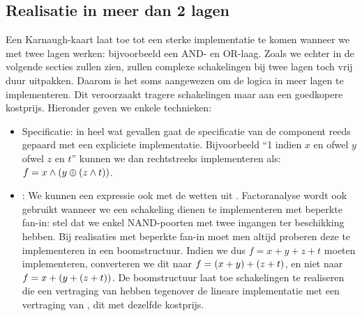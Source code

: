 \subsection{Realisatie in meer dan 2 lagen}
Een Karnaugh-kaart laat toe tot een sterke implementatie te komen wanneer we met twee lagen werken: bijvoorbeeld een AND- en OR-laag. Zoals we echter in de volgende secties zullen zien, zullen complexe schakelingen bij twee lagen toch vrij duur uitpakken. Daarom is het soms aangewezen om de logica in meer lagen te implementeren. Dit veroorzaakt tragere schakelingen maar aan een goedkopere kostprijs. Hieronder geven we enkele technieken:

\begin{itemize}
 \item Specificatie: in heel wat gevallen gaat de specificatie van de component reeds gepaard met een expliciete implementatie. Bijvoorbeeld ``1 indien $x$ en ofwel $y$ ofwel $z$ en $t$'' kunnen we dan rechtstreeks implementeren als: $f=x\wedge\left( y\oplus\left( z\wedge t \right) \right)$.
 \item {}: We kunnen een expressie ook  met de wetten uit . Factoranalyse wordt ook gebruikt wanneer we een schakeling dienen te implementeren met beperkte fan-in: stel dat we enkel NAND-poorten met twee ingangen ter beschikking hebben. Bij realisaties met beperkte fan-in moet men altijd proberen deze te implementeren in een boomstructuur. Indien we dus $f=x+y+z+t$ moeten implementeren, converteren we dit naar $f=\left( x+y \right)+\left( z+t \right)$, en niet naar $f=x+\left( y+\left( z+t \right) \right)$. De boomstructuur laat toe schakelingen te realiseren die een vertraging van  hebben tegenover de lineare implementatie met een vertraging van , dit met dezelfde kostprijs.

\end{itemize}
